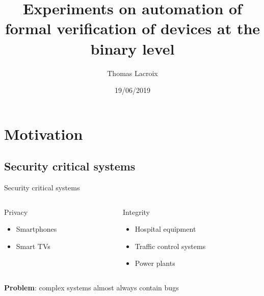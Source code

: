 \documentclass[xcolor={x11names}]{beamer}
\title{Experiments on automation of formal verification of devices at the binary level}
\subtitle{}
\author{Thomas Lacroix}
\institute{INSA Lyon \\ Soutenance de PFE (Option R\&D)}
\date{19/06/2019}
\begin{document}
\begin{frame}
    \maketitle
\end{frame}


\section{Motivation}


\subsection{Security critical systems}

\begin{frame}{Security critical systems}
    \begin{columns}
        \begin{column}{0.5\textwidth}
            Privacy

            \begin{itemize}
                \item Smartphones
                \item Smart TVs
            \end{itemize}
        \end{column}
        \begin{column}{0.5\textwidth}
            Integrity

            \begin{itemize}
                \item Hospital equipment
                \item Traffic control systems
                \item Power plants
            \end{itemize}
        \end{column}
    \end{columns}

    \vfill
    \pause

    \textbf{Problem}: complex systems almost always contain bugs
\end{frame}
\end{document}
